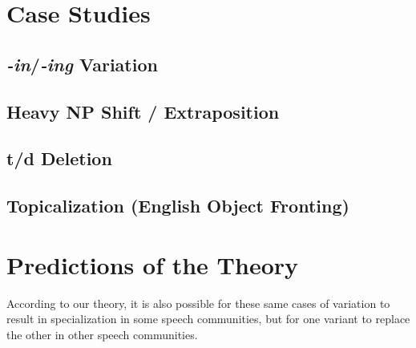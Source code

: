 \section{Case Studies}
\label{cases}

\subsection{\textsl{-in}/\textsl{-ing} Variation}

\subsection{Heavy NP Shift / Extraposition}

\subsection{t/d Deletion}

\subsection{Topicalization (English Object Fronting)}
\label{topsect}

\section{Predictions of the Theory}

According to our theory, it is also possible for these same cases of variation to result in specialization in some speech communities, but for one variant to replace the other in other speech communities.

